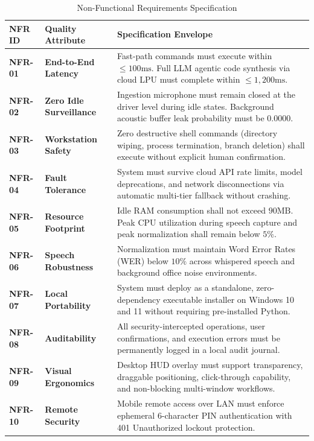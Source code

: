\begin{table}[htbp]
\centering
\small
\caption{Non-Functional Requirements Specification}
\label{tab:non_functional_requirements}
\begin{tabularx}{\textwidth}{|l|p{3.2cm}|X|}
\hline
\textbf{NFR ID} & \textbf{Quality Attribute} & \textbf{Specification Envelope} \\ \hline
\textbf{NFR-01} & \textbf{End-to-End Latency} & Fast-path commands must execute within $\le 100\text{ms}$. Full LLM agentic code synthesis via cloud LPU must complete within $\le 1,200\text{ms}$. \\ \hline
\textbf{NFR-02} & \textbf{Zero Idle Surveillance} & Ingestion microphone must remain closed at the driver level during idle states. Background acoustic buffer leak probability must be $0.0000$. \\ \hline
\textbf{NFR-03} & \textbf{Workstation Safety} & Zero destructive shell commands (directory wiping, process termination, branch deletion) shall execute without explicit human confirmation. \\ \hline
\textbf{NFR-04} & \textbf{Fault Tolerance} & System must survive cloud API rate limits, model deprecations, and network disconnections via automatic multi-tier fallback without crashing. \\ \hline
\textbf{NFR-05} & \textbf{Resource Footprint} & Idle RAM consumption shall not exceed $90\text{MB}$. Peak CPU utilization during speech capture and peak normalization shall remain below $5\%$. \\ \hline
\textbf{NFR-06} & \textbf{Speech Robustness} & Normalization must maintain Word Error Rates (WER) below $10\%$ across whispered speech and background office noise environments. \\ \hline
\textbf{NFR-07} & \textbf{Local Portability} & System must deploy as a standalone, zero-dependency executable installer on Windows 10 and 11 without requiring pre-installed Python. \\ \hline
\textbf{NFR-08} & \textbf{Auditability} & All security-intercepted operations, user confirmations, and execution errors must be permanently logged in a local audit journal. \\ \hline
\textbf{NFR-09} & \textbf{Visual Ergonomics} & Desktop HUD overlay must support transparency, draggable positioning, click-through capability, and non-blocking multi-window workflows. \\ \hline
\textbf{NFR-10} & \textbf{Remote Security} & Mobile remote access over LAN must enforce ephemeral 6-character PIN authentication with 401 Unauthorized lockout protection. \\ \hline
\end{tabularx}
\end{table}

